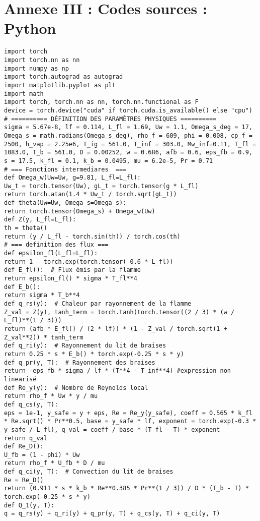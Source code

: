 \documentclass[12pt, oneside]{report} %
\theoremstyle{definition}
\theoremstyle{remark}
\begin{document}
\chapter*{Annexe III : Codes sources : Python}
\label{chp:annexe III}

\begin{lstlisting}[style=pythonstyle]
import torch
import torch.nn as nn
import numpy as np
import torch.autograd as autograd
import matplotlib.pyplot as plt
import math
import torch, torch.nn as nn, torch.nn.functional as F
device = torch.device("cuda" if torch.cuda.is_available() else "cpu")
# ========== DÉFINITION DES PARAMÈTRES PHYSIQUES ==========
sigma = 5.67e-8, lf = 0.114, L_fl = 1.69, Uw = 1.1, Omega_s_deg = 17, Omega_s = math.radians(Omega_s_deg), rho_f = 609, phi = 0.008, cp_f = 2500, h_vap = 2.25e6, T_ig = 561.0, T_inf = 303.0, Mw_inf=0.11, T_fl = 1083.0, T_b = 561.0, D = 0.00252, w = 0.686, afb = 0.6, eps_fb = 0.9, s = 17.5, k_fl = 0.1, k_b = 0.0495, mu = 6.2e-5, Pr = 0.71
# === Fonctions intermediares  ===
def Omega_w(Uw=Uw, g=9.81, L_fl=L_fl):
Uw_t = torch.tensor(Uw), gL_t = torch.tensor(g * L_fl)
return torch.atan(1.4 * Uw_t / torch.sqrt(gL_t))
def theta(Uw=Uw, Omega_s=Omega_s):
return torch.tensor(Omega_s) + Omega_w(Uw)
def Z(y, L_fl=L_fl):
th = theta()
return (y / L_fl - torch.sin(th)) / torch.cos(th)
# === definition des flux ===
def epsilon_fl(L_fl=L_fl):
return 1 - torch.exp(torch.tensor(-0.6 * L_fl))
def E_fl():  # Flux émis par la flamme
return epsilon_fl() * sigma * T_fl**4
def E_b():
return sigma * T_b**4
def q_rs(y):  # Chaleur par rayonnement de la flamme
Z_val = Z(y), tanh_term = torch.tanh(torch.tensor((2 / 3) * (w / L_fl)**(1 / 3)))
return (afb * E_fl() / (2 * lf)) * (1 - Z_val / torch.sqrt(1 + Z_val**2)) * tanh_term
def q_ri(y):  # Rayonnement du lit de braises
return 0.25 * s * E_b() * torch.exp(-0.25 * s * y)
def q_pr(y, T):  # Rayonnement des braises
return -eps_fb * sigma / lf * (T**4 - T_inf**4) #expression non linearisé
def Re_y(y):  # Nombre de Reynolds local
return rho_f * Uw * y / mu
def q_cs(y, T):
eps = 1e-1, y_safe = y + eps, Re = Re_y(y_safe), coeff = 0.565 * k_fl * Re.sqrt() * Pr**0.5, base = y_safe * lf, exponent = torch.exp(-0.3 * y_safe / L_fl), q_val = coeff / base * (T_fl - T) * exponent
return q_val 
def Re_D():
U_fb = (1 - phi) * Uw
return rho_f * U_fb * D / mu
def q_ci(y, T):  # Convection du lit de braises
Re = Re_D()
return (0.911 * s * k_b * Re**0.385 * Pr**(1 / 3)) / D * (T_b - T) * torch.exp(-0.25 * s * y)
def Q_1(y, T):
q = q_rs(y) + q_ri(y) + q_pr(y, T) + q_cs(y, T) + q_ci(y, T)

\end{lstlisting}
\end{document}

